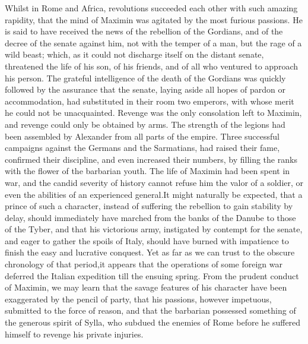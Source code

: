 Whilst in Rome and Africa, revolutions succeeded each other with
such amazing rapidity, that the mind of Maximin was agitated by
the most furious passions. He is said to have received the news
of the rebellion of the Gordians, and of the decree of the senate
against him, not with the temper of a man, but the rage of a wild
beast; which, as it could not discharge itself on the distant
senate, threatened the life of his son, of his friends, and of
all who ventured to approach his person. The grateful
intelligence of the death of the Gordians was quickly followed by
the assurance that the senate, laying aside all hopes of pardon
or accommodation, had substituted in their room two emperors,
with whose merit he could not be unacquainted. Revenge was the
only consolation left to Maximin, and revenge could only be
obtained by arms. The strength of the legions had been assembled
by Alexander from all parts of the empire. Three successful
campaigns against the Germans and the Sarmatians, had raised
their fame, confirmed their discipline, and even increased their
numbers, by filling the ranks with the flower of the barbarian
youth. The life of Maximin had been spent in war, and the candid
severity of history cannot refuse him the valor of a soldier, or
even the abilities of an experienced general.\footnotemark[31] It might
naturally be expected, that a prince of such a character, instead
of suffering the rebellion to gain stability by delay, should
immediately have marched from the banks of the Danube to those of
the Tyber, and that his victorious army, instigated by contempt
for the senate, and eager to gather the spoils of Italy, should
have burned with impatience to finish the easy and lucrative
conquest. Yet as far as we can trust to the obscure chronology of
that period,\footnotemark[32] it appears that the operations of some foreign
war deferred the Italian expedition till the ensuing spring. From
the prudent conduct of Maximin, we may learn that the savage
features of his character have been exaggerated by the pencil of
party, that his passions, however impetuous, submitted to the
force of reason, and that the barbarian possessed something of
the generous spirit of Sylla, who subdued the enemies of Rome
before he suffered himself to revenge his private injuries.\footnotemark[33]


